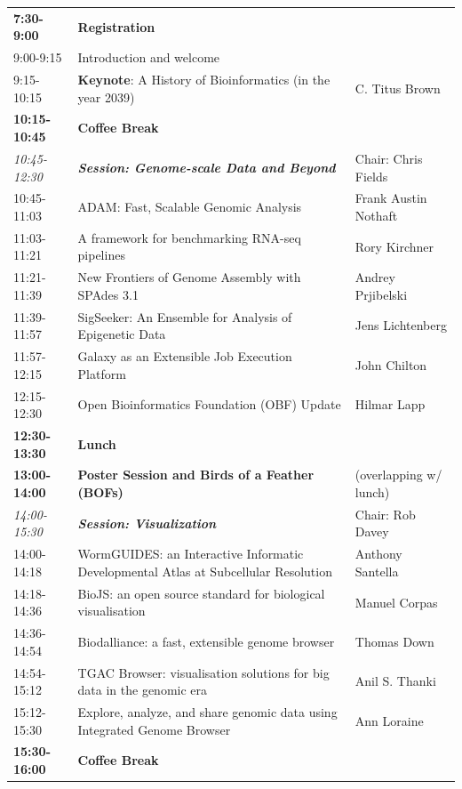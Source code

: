 \documentclass[12pt,oneside]{article}
\begin{document}
\begin{center}
\begin{tabular}{|p{2.4cm}|p{10cm}|p{4.2cm}|}
\hline
\textbf{7:30-9:00} & \textbf{Registration} &\\
9:00-9:15 & Introduction and welcome &\\
9:15-10:15 & \textbf{Keynote}: A History of Bioinformatics (in the year 2039) & C. Titus Brown\\
\hline
\textbf{10:15-10:45} & \textbf{Coffee Break} &\\
\hline
\textit{10:45-12:30} & \textbf{\textit{Session: Genome-scale Data and Beyond}} & Chair: Chris Fields\\
10:45-11:03 & ADAM: Fast, Scalable Genomic Analysis & Frank Austin Nothaft\\
11:03-11:21 & A framework for benchmarking RNA-seq pipelines & Rory Kirchner\\
11:21-11:39 & New Frontiers of Genome Assembly with SPAdes 3.1 & Andrey Prjibelski\\
11:39-11:57 & SigSeeker: An Ensemble for Analysis of Epigenetic Data & Jens Lichtenberg\\
11:57-12:15 & Galaxy as an Extensible Job Execution Platform & John Chilton\\
12:15-12:30 & Open Bioinformatics Foundation (OBF) Update & Hilmar Lapp\\
\hline
\textbf{12:30-13:30} & \textbf{Lunch} &\\
\textbf{13:00-14:00} & \textbf{Poster Session and Birds of a Feather (BOFs)} &  (overlapping w/ lunch)\\
\hline
\textit{14:00-15:30} & \textbf{\textit{Session: Visualization}} & Chair: Rob Davey\\
14:00-14:18 & WormGUIDES: an Interactive Informatic Developmental Atlas at Subcellular Resolution & Anthony Santella\\
14:18-14:36 & BioJS: an open source standard for biological visualisation & Manuel Corpas\\
14:36-14:54 & Biodalliance: a fast, extensible genome browser & Thomas Down\\
14:54-15:12 & TGAC Browser: visualisation solutions for big data in the genomic era & Anil S. Thanki\\
15:12-15:30 & Explore, analyze, and share genomic data using Integrated Genome Browser & Ann Loraine\\
\hline
\textbf{15:30-16:00} & \textbf{Coffee Break} &\\
\hline
\end{tabular}
\end{center}
\end{document}
